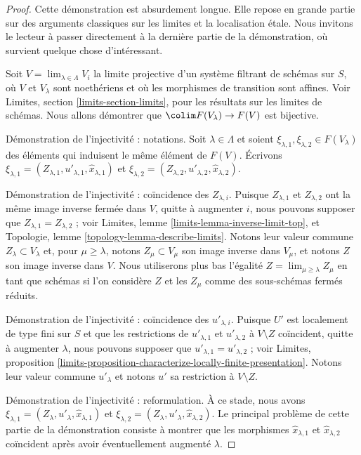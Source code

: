 \begin{proof}
Cette démonstration est absurdement longue. Elle repose en grande partie sur des arguments classiques
sur les limites et la localisation \'etale. Nous invitons le lecteur à passer directement
à la dernière partie de la démonstration, où survient quelque chose d'intéressant.

\medskip\noindent
Soit $V = \lim_{\lambda \in \Lambda} V_i$ la limite projective d'un système filtrant de schémas
sur $S$, où $V$ et $V_\lambda$ sont noethériens et où les morphismes de transition
sont affines. Voir Limites, section \ref{limits-section-limits}, pour les résultats sur les
limites de schémas. Nous allons démontrer que $\colim F(V_\lambda) \to F(V)$
est bijective.

\medskip\noindent
Démonstration de l'injectivité : notations.
Soit $\lambda \in \Lambda$ et soient
$\xi_{\lambda, 1}, \xi_{\lambda, 2} \in F(V_\lambda)$
des éléments qui induisent le même élément de $F(V)$.
Écrivons $\xi_{\lambda, 1} = (Z_{\lambda, 1}, u'_{\lambda, 1},
\hat x_{\lambda, 1})$ et
$\xi_{\lambda, 2} = (Z_{\lambda, 2}, u'_{\lambda, 2}, \hat x_{\lambda, 2})$.

\medskip\noindent
Démonstration de l'injectivité : coïncidence des $Z_{\lambda, i}$.
Puisque $Z_{\lambda, 1}$ et $Z_{\lambda, 2}$ ont la même image inverse fermée
dans $V$, quitte à augmenter $i$, nous pouvons supposer que
$Z_{\lambda, 1} = Z_{\lambda, 2}$ ; voir
Limites, lemme \ref{limits-lemma-inverse-limit-top}, et
Topologie, lemme \ref{topology-lemma-describe-limits}.
Notons leur valeur commune $Z_\lambda \subset V_\lambda$ et, pour
$\mu \geq \lambda$,
notons $Z_\mu \subset V_\mu$ son image inverse dans $V_\mu$, et
notons $Z$ son image inverse dans $V$. Nous utiliserons plus bas l'égalité
$Z = \lim_{\mu \geq \lambda} Z_\mu$ en tant que schémas si l'on considère $Z$
et les $Z_\mu$ comme des sous-schémas fermés réduits.

\medskip\noindent
Démonstration de l'injectivité : coïncidence des $u'_{\lambda, i}$.
Puisque $U'$ est localement de type fini sur $S$ et que
les restrictions de $u'_{\lambda, 1}$ et $u'_{\lambda, 2}$
à $V \setminus Z$ coïncident, quitte à augmenter $\lambda$, nous pouvons supposer que
$u'_{\lambda, 1} = u'_{\lambda, 2}$ ; voir Limites, proposition
\ref{limits-proposition-characterize-locally-finite-presentation}.
Notons leur valeur commune $u'_\lambda$ et notons
$u'$ sa restriction à $V \setminus Z$.

\medskip\noindent
Démonstration de l'injectivité : reformulation.
À ce stade, nous avons
$\xi_{\lambda, 1} = (Z_\lambda, u'_\lambda, \hat x_{\lambda, 1})$ et
$\xi_{\lambda, 2} = (Z_\lambda, u'_\lambda, \hat x_{\lambda, 2})$.
Le principal problème de cette partie de la démonstration
consiste à montrer que les morphismes
$\hat x_{\lambda, 1}$ et $\hat x_{\lambda, 2}$ coïncident après avoir
éventuellement augmenté $\lambda$.


\end{proof}
